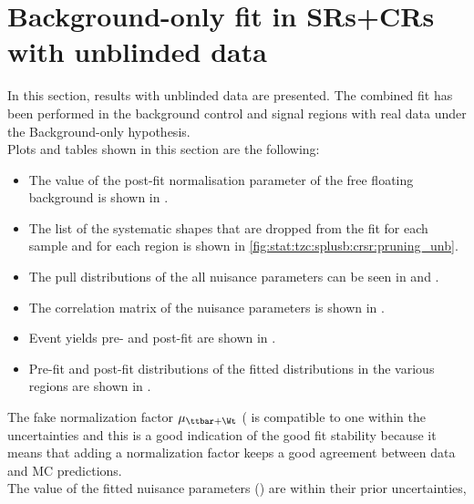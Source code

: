 \section{Background-only fit in SRs+CRs with unblinded data}
\label{sec:stat:tzc:unb}
In this section, results with unblinded data are presented. The combined fit has been performed in the background 
control and signal regions with real data under the Background-only hypothesis.\\
Plots and tables shown in this section are the following:
\begin{itemize}
	\item The value of the post-fit normalisation parameter of the free floating background is shown in .
	\item The list of the systematic shapes that are dropped from the fit for each sample and for each region is shown in \cref{fig:stat:tzc:splusb:crsr:pruning_unb}.
	\item The pull distributions of the all nuisance parameters can be seen in  and . 
	\item The correlation matrix of the nuisance parameters is shown in . 
	\item Event yields pre- and post-fit are shown in . 
	\item Pre-fit and post-fit distributions of the fitted distributions in the various regions are shown in .
\end{itemize}
The fake normalization factor $\mu_{\ttbar+\Wt}$ ( is compatible to one within the uncertainties and
this is a good indication of the good fit stability because it means that adding a normalization factor keeps
a good agreement between data and MC predictions.\\
The value of the fitted nuisance parameters () are within their prior uncertainties,
